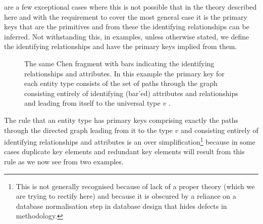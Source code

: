 \documentclass[10pt,a4paper]{article}
\newcommand{\veee}{v}
\begin{document}
are a few exceptional cases where this is not possible that in the theory described here and 
with the requirement to cover the most general case
it is the primary keys that are the primitives and
from these the identifying relationships can be inferred.  
Not withstanding this, in examples, unless otherwise stated,
we define the identifying relationships and have the primary keys implied from them. 
\begin{figure} [H]  %
\begin{center}
\barstrue

\end{center}
\caption{The same Chen fragment with bars indicating the identifying relationships and attributes. In this example the primary key for each entity type consists of the set of paths through the graph consisting entirely
of identifying (bar'ed) attributes and relationships and leading from itself to the universal type $\veee$ .}
\label{chenfragment}
\end{figure}

The rule that an entity type has primary keys comprising exactly the paths through the directed graph leading from it
to the type $\veee$ and consisting entirely of identifying relationships and attributes is 
an over simplification\footnote{This is not generally recognised because 
of lack of a proper theory (which we are trying to rectify  here) and because it is obscured by a reliance on
a database normalisation step in database design that hides defects in methodology.}
because in some cases duplicate key elements and redundant key elements will result from this rule as we now see
from two examples.
\end{document}
